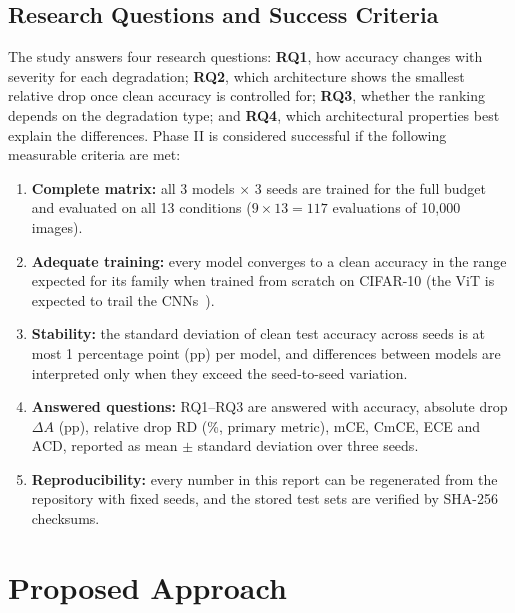 \documentclass[conference]{IEEEtran}
\begin{document}
\subsection{Research Questions and Success Criteria}
The study answers four research questions: \textbf{RQ1}, how accuracy changes with severity for each degradation; \textbf{RQ2}, which architecture shows the smallest relative drop once clean accuracy is controlled for; \textbf{RQ3}, whether the ranking depends on the degradation type; and \textbf{RQ4}, which architectural properties best explain the differences. Phase II is considered successful if the following measurable criteria are met:
\begin{enumerate}
\item[\textbf{S1}] \textbf{Complete matrix:} all $3$ models $\times$ $3$ seeds are trained for the full budget and evaluated on all 13 conditions ($9 \times 13 = 117$ evaluations of 10{,}000 images).
\item[\textbf{S2}] \textbf{Adequate training:} every model converges to a clean accuracy in the range expected for its family when trained from scratch on CIFAR-10 (the ViT is expected to trail the CNNs~\cite{dosovitskiy2021,kotyan2024}).
\item[\textbf{S3}] \textbf{Stability:} the standard deviation of clean test accuracy across seeds is at most 1 percentage point (pp) per model, and differences between models are interpreted only when they exceed the seed-to-seed variation.
\item[\textbf{S4}] \textbf{Answered questions:} RQ1--RQ3 are answered with accuracy, absolute drop $\Delta A$ (pp), relative drop RD (\%, primary metric), mCE, CmCE, ECE and ACD, reported as mean $\pm$ standard deviation over three seeds.
\item[\textbf{S5}] \textbf{Reproducibility:} every number in this report can be regenerated from the repository with fixed seeds, and the stored test sets are verified by SHA-256 checksums.
\end{enumerate}

\section{Proposed Approach}
\end{document}
